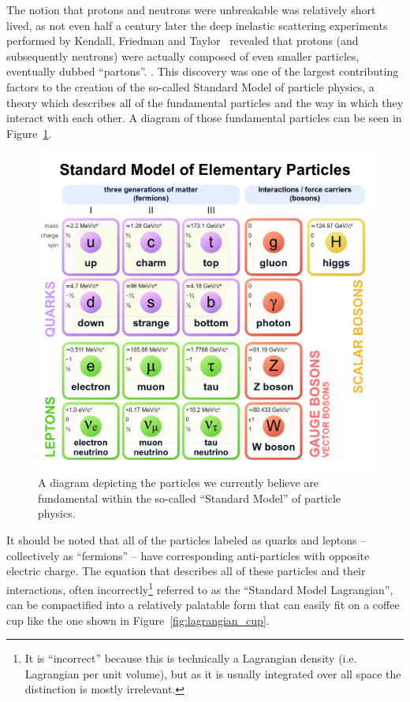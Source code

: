 The notion that protons and neutrons were unbreakable was relatively short lived, as not even half a century later the deep inelastic scattering experiments performed by Kendall, Friedman and Taylor~\cite{Kendall, Friedman, Taylor} revealed that protons (and subsequently neutrons) were actually composed of even smaller particles, eventually dubbed ``partons''. \cite{Partons}.
This discovery was one of the largest contributing factors to the creation of the so-called Standard Model of particle physics, a theory which describes all of the fundamental particles and the way in which they interact with each other. A diagram of those fundamental particles can be seen in Figure~\ref{fig:standard_model}.
\begin{figure}
    \centering
    \includegraphics[scale=0.2]{figures/introduction/StandardModel.png}
    \caption{A diagram depicting the particles we currently believe are fundamental within the so-called ``Standard Model'' of particle physics.}
    \label{fig:standard_model}
\end{figure}
 It should be noted that all of the particles labeled as quarks and leptons -- collectively as ``fermions'' -- have corresponding anti-particles with opposite electric charge.
The equation that describes all of these particles and their interactions, often incorrectly\footnote[1]{It is ``incorrect'' because this is technically a Lagrangian density (i.e. Lagrangian per unit volume), but as it is usually integrated over all space the distinction is mostly irrelevant.} referred to as the ``Standard Model Lagrangian'', can be compactified into a relatively palatable form that can easily fit on a coffee cup like the one shown in Figure~\ref{fig:lagrangian_cup}.
